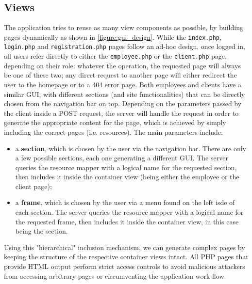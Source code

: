 \subsection{Views}
The application tries to reuse as many view components as possible, by building pages dynamically as shown in \autoref{figure:gui_design}. 
While the \texttt{index.php}, \texttt{login.php} and \texttt{registration.php} pages follow an ad-hoc design, once logged in, all users refer directly to either the \texttt{employee.php} or the \texttt{client.php} page, depending on their role: whatever the operation, the requested page will always be one of these two; any direct request to another page will either redirect the user to the homepage or to a 404 error page. Both employees and clients have a similar GUI, with different sections (and site functionalities) that can be directly chosen from the navigation bar on top.\newline
Depending on the parameters passed by the client inside a POST request, the server will handle the request in order to generate the appropriate content for the page, which is achieved by simply including the correct pages (i.e. resources). The main parameters include:
\begin{itemize}
	\item a \textbf{section}, which is chosen by the user via the navigation bar. There are only a few possible sections, each one generating a different GUI. The server queries the resource mapper with a logical name for the requested section, then includes it inside the container view (being either the employee or the client page);
	\item a \textbf{frame}, which is chosen by the user via a menu found on the left isde of each section. The server queries the resource mapper with a logical name for the requested frame, then includes it inside the container view, in this case being the section.
\end{itemize}
Using this "hierarchical" inclusion mechanism, we can generate complex pages by keeping the structure of the respective container views intact.
All PHP pages that provide HTML output perform strict access controls to avoid malicious attackers from accessing arbitrary pages or circumventing the application work-flow.


